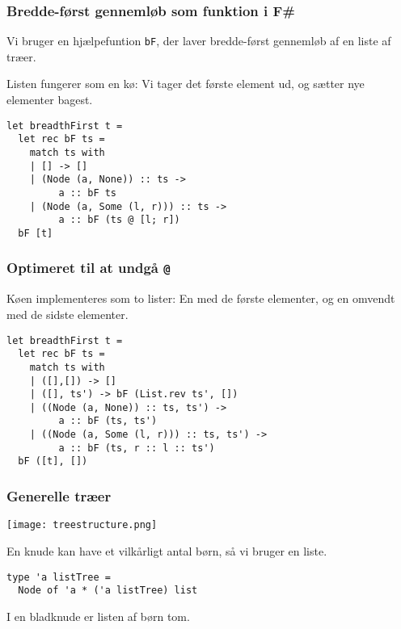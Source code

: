 \documentclass{beamer}
\begin{document}
\begin{frame}[fragile=singleslide]
\frametitle{Bredde-først gennemløb som funktion i F\#}

Vi bruger en hjælpefuntion \texttt{bF}, der laver bredde-først
gennemløb af en liste af træer.

Listen fungerer som en kø: Vi tager det første element ud, og sætter
nye elementer bagest.

\renewcommand{\baselinestretch}{0.9}
\begin{verbatim}
let breadthFirst t =
  let rec bF ts =
    match ts with
    | [] -> []
    | (Node (a, None)) :: ts ->
         a :: bF ts
    | (Node (a, Some (l, r))) :: ts ->
         a :: bF (ts @ [l; r]) 
  bF [t]
\end{verbatim}

\end{frame}

\begin{frame}[fragile=singleslide]
\frametitle{Optimeret til at undgå \texttt{@}}

Køen implementeres som to lister: En med de første elementer, og en
omvendt med de sidste elementer.

\renewcommand{\baselinestretch}{0.9}
\begin{verbatim}
let breadthFirst t =
  let rec bF ts =
    match ts with
    | ([],[]) -> []
    | ([], ts') -> bF (List.rev ts', [])
    | ((Node (a, None)) :: ts, ts') ->
         a :: bF (ts, ts')
    | ((Node (a, Some (l, r))) :: ts, ts') ->
         a :: bF (ts, r :: l :: ts')
  bF ([t], [])
\end{verbatim}

\end{frame}

\begin{frame}[fragile=singleslide]
\frametitle{Generelle træer}

\begin{center}
\texttt{[image: treestructure.png]}
\end{center}

En knude kan have et vilkårligt antal børn, så vi bruger en liste.

\begin{verbatim}
type 'a listTree =
  Node of 'a * ('a listTree) list
\end{verbatim}

I en bladknude er listen af børn tom.

\end{frame}
\end{document}
